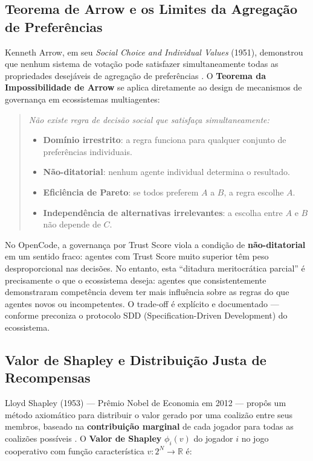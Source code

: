 \subsection{Teorema de Arrow e os Limites da Agregação de Preferências}

Kenneth Arrow, em seu \textit{Social Choice and Individual Values} (1951), demonstrou que nenhum sistema de votação pode satisfazer simultaneamente todas as propriedades desejáveis de agregação de preferências \cite{arrow1951social}. O \textbf{Teorema da Impossibilidade de Arrow} se aplica diretamente ao design de mecanismos de governança em ecossistemas multiagentes:

\begin{quote}
\textit{Não existe regra de decisão social que satisfaça simultaneamente:}
\begin{itemize}
    \item \textbf{Domínio irrestrito}: a regra funciona para qualquer conjunto de preferências individuais.
    \item \textbf{Não-ditatorial}: nenhum agente individual determina o resultado.
    \item \textbf{Eficiência de Pareto}: se todos preferem $A$ a $B$, a regra escolhe $A$.
    \item \textbf{Independência de alternativas irrelevantes}: a escolha entre $A$ e $B$ não depende de $C$.
\end{itemize}
\end{quote}

No OpenCode, a governança por Trust Score viola a condição de \textbf{não-ditatorial} em um sentido fraco: agentes com Trust Score muito superior têm peso desproporcional nas decisões. No entanto, esta ``ditadura meritocrática parcial'' é precisamente o que o ecossistema deseja: agentes que consistentemente demonstraram competência devem ter mais influência sobre as regras do que agentes novos ou incompetentes. O trade-off é explícito e documentado --- conforme preconiza o protocolo SDD (Specification-Driven Development) do ecossistema.

\subsection{Valor de Shapley e Distribuição Justa de Recompensas}

Lloyd Shapley (1953) --- Prêmio Nobel de Economia em 2012 --- propôs um método axiomático para distribuir o valor gerado por uma coalizão entre seus membros, baseado na \textbf{contribuição marginal} de cada jogador para todas as coalizões possíveis \cite{shapley1953value}. O \textbf{Valor de Shapley} $\phi_i(v)$ do jogador $i$ no jogo cooperativo com função característica $v: 2^N \to \mathbb{R}$ é:

